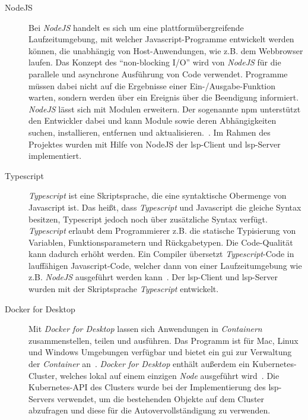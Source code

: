 \begin{description}
  \item[NodeJS]
        Bei \textit{NodeJS} handelt es sich um eine plattformübergreifende Laufzeitumgebung, mit welcher Javascript-Programme entwickelt werden können,
        die unabhängig von Host-Anwendungen, wie z.B. dem Webbrowser laufen.
        Das Konzept des ``non-blocking I/O'' wird von \textit{NodeJS} für die parallele und asynchrone Ausführung von Code verwendet.
        Programme müssen dabei nicht auf die Ergebnisse einer Ein-/Ausgabe-Funktion warten,
        sondern werden über ein Ereignis über die Beendigung informiert.
        \textit{NodeJS} lässt sich mit Modulen erweitern.
        Der sogenannte \ac{npm} unterstützt den Entwickler dabei und kann Module sowie deren Abhängigkeiten suchen,
        installieren, entfernen und aktualisieren.~\cite{node-js-dev-insider,node-js-about}.
        Im Rahmen des Projektes wurden mit Hilfe von NodeJS der \ac{lsp}-Client und \ac{lsp}-Server implementiert.
  \item[Typescript]
        \textit{Typescript} ist eine Skriptsprache, die eine syntaktische Obermenge von Javascript ist. Das heißt, dass \textit{Typescript} und Javascript
        die gleiche Syntax besitzen, Typescript jedoch noch über zusätzliche Syntax verfügt.
        \textit{Typescript} erlaubt dem Programmierer z.B. die statische Typisierung von Variablen, Funktionsparametern und Rückgabetypen.
        Die Code-Qualität kann dadurch erhöht werden. Ein Compiler übersetzt \textit{Typescript}-Code in lauffähigen Javascript-Code, welcher dann von einer
        Laufzeitumgebung wie z.B. \textit{NodeJS} ausgeführt werden kann~\cite{typescript-kinsta,typescript-doubleslash-blog}.
        Der \ac{lsp}-Client und \ac{lsp}-Server wurden mit der Skriptsprache \textit{Typescript} entwickelt.
  \item[Docker for Desktop]
        Mit \textit{Docker for Desktop} lassen sich Anwendungen in \textit{Containern} zusammenstellen, teilen und ausführen.
        Das Programm ist für Mac, Linux und Windows Umgebungen verfügbar und bietet ein \ac{gui} zur Verwaltung der \textit{Container} an~\cite{docker-for-desktop-overview}.
        \textit{Docker for Desktop} enthält außerdem ein Kubernetes-Cluster, welches lokal auf einem einzigen \textit{Node} ausgeführt wird~\cite{docker-for-desktop-kubernetes}.
        Die Kubernetes-API des Clusters wurde bei der Implementierung des \ac{lsp}-Servers verwendet, um
        die bestehenden Objekte auf dem Cluster abzufragen und diese für die Autovervollständigung zu verwenden.

\end{description}
